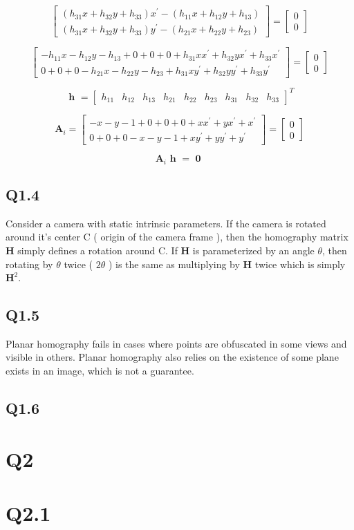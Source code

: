 \documentclass[12pt]{article}
\begin{document}
$$
\begin{bmatrix}
( h_{31} x + h_{32} y + h_{33} ) x^{ \prime } - ( h_{11} x + h_{12} y + h_{13} ) \\
( h_{31} x + h_{32} y + h_{33} ) y^{ \prime } - ( h_{21} x + h_{22} y + h_{23} )
\end{bmatrix}
=
\begin{bmatrix}
0 \\ 0
\end{bmatrix}
$$

$$
\begin{bmatrix}
- h_{11} x 
- h_{12} y 
- h_{13}
+ 0 + 0 + 0
+ h_{31} x  x^{ \prime }
+ h_{32} y  x^{ \prime }
+ h_{33} x^{ \prime }   \\
0 + 0 + 0
- h_{21} x 
- h_{22} y 
- h_{23}
+ h_{31} x y^{ \prime } 
+ h_{32} y y^{ \prime } 
+ h_{33}   y^{ \prime } 
\end{bmatrix}
=
\begin{bmatrix}
0 \\ 0
\end{bmatrix}
$$

$$
\textbf { h } = 
\begin{bmatrix}
h_{11} & h_{12} & h_{13} & h_{21} & h_{22} & h_{23} & h_{31} & h_{32} & h_{33} 
\end{bmatrix}^{T}
$$

$$
\textbf{A}_{i} = 
\begin{bmatrix}
- x 
- y 
- 1
+ 0 + 0 + 0
+ x  x^{ \prime }
+ y  x^{ \prime }
+ x^{ \prime }   \\
0 + 0 + 0
- x 
- y 
- 1
+ x y^{ \prime } 
+ y y^{ \prime } 
+   y^{ \prime } 
\end{bmatrix}
=
\begin{bmatrix}
0 \\ 0
\end{bmatrix}
$$

$$
\textbf{A}_{i} 
\textbf { h } =  \textbf { 0 }
$$


\subsection{Q1.4}
Consider a camera with static intrinsic parameters. If the camera is rotated around it's center C ( origin of the camera frame ), then the homography matrix $\textbf{H}$ simply defines a rotation around C. If  $\textbf{H}$ is parameterized by an angle $\theta$, then rotating by $\theta$ twice ( $2 \theta$ ) is the same as multiplying by $\textbf{H}$ twice which is simply $\textbf{H}^{2}$.

\subsection{Q1.5}
Planar homography fails in cases where points are obfuscated in some views and visible in others. Planar homography also relies on the existence of some plane exists in an image, which is not a guarantee.
\subsection{Q1.6}

\section{Q2}
\section{Q2.1}
\end{document}
